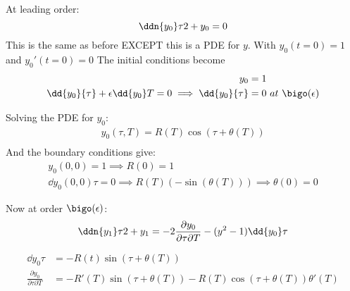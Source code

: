 \documentclass{X:/Documents/Coding/Latex/myassignment}
\begin{document}
At leading order:
\[\ddn{y_0}\tau2 + y_0 = 0\]
This is the same as before EXCEPT this is a PDE for $y$.
With $y_0(t=0) = 1$ and $y_0'(t=0)=0$
The initial conditions become
\begin{align*}
    y_0 &=1\\
    \dd{y_0}{\tau} + \epsilon \dd{y_0}T = 0\implies \dd{y_0}{\tau} &= 0 \ at \ \bigo(\epsilon)
\end{align*}


Solving the PDE for $y_0$:
\begin{align*}
    y_0(\tau,T) = R(T)\cos(\tau +\theta(T))\\
\end{align*}
And the boundary conditions give:
\begin{align*}
    y_0(0,0) = 1 \implies R(0) = 1\\
    \dd{y_0(0,0)}{\tau} = 0 \implies R(T)(-\sin(\theta(T)))\implies \theta(0) = 0
\end{align*}

Now at order $\bigo(\epsilon)$:
\[
    \ddn{y_1}\tau2 + y_1 = - 2\frac{\partial y_0}{\partial \tau \partial T} - (y^2-1)\dd{y_0}\tau
\]

\begin{align*}
    \dd{y_0}\tau &= -R(t) \sin(\tau + \theta(T))\\
    \frac{\partial y_0}{\partial \tau \partial T} &= -R'(T)\sin(\tau+\theta(T)) -R(T)\cos(\tau+\theta(T))\theta'(T) 
\end{align*}
\end{document}
